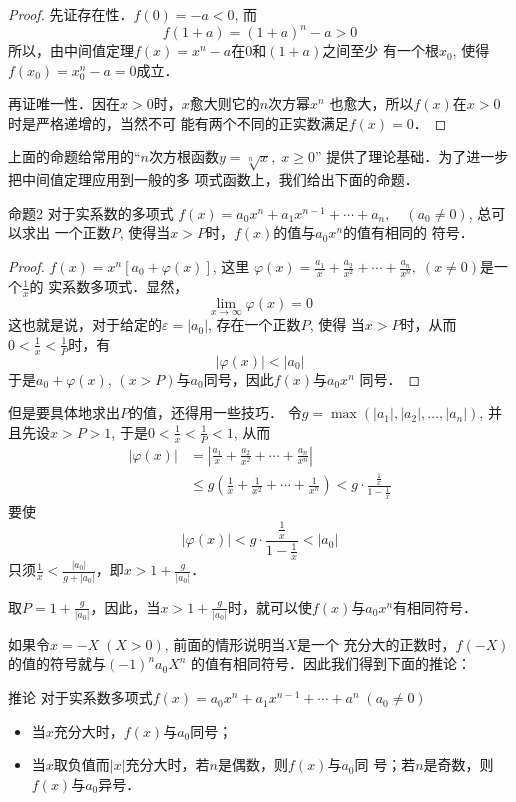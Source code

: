 \begin{proof}
    先证存在性．$f(0)=-a<0$, 而
\[f(1+a)=(1+a)^n-a>0\]
所以，由中间值定理$f(x)=x^n-a$在0和$(1+a)$之间至少
有一个根$x_0$, 使得$f(x_0)=x_0^n-a=0$成立．

再证唯一性．因在$x>0$时，$x$愈大则它的$n$次方幂$x^n$
也愈大，所以$f(x)$在$x>0$时是严格递增的，当然不可
能有两个不同的正实数满足$f(x)=0$．
\end{proof}

上面的命题给常用的“$n$次方根函数$y=\sqrt[n]{x},\; x\ge0$”
提供了理论基础．为了进一步把中间值定理应用到一般的多
项式函数上，我们给出下面的命题．

\begin{blk}{命题2 }
对于实系数的多项式
$f(x)=a_0x^n+a_1x^{n-1}+\cdots+a_n,\quad (a_0\ne 0)$, 总可以求出
一个正数$P$, 使得当$x>P$时，$f(x)$的值与$a_0x^n$的值有相同的
符号．
\end{blk}

\begin{proof}
$f(x)=x^n[a_0+\varphi(x)]$, 这里
$\varphi(x)=\frac{a_1}{x}+\frac{a_2}{x^2}+\cdots+\frac{a_n}{x^n},\; (x\ne 0)$是一个$\frac{1}{x}$的
实系数多项式．显然，
\[\lim_{x\to\infty} \varphi(x)=0\]
这也就是说，对于给定的$\varepsilon=|a_0|$, 存在一个正数$P$, 使得
当$x>P$时，从而$0<\frac{1}{x}<\frac{1}{P}$时，有
\[|\varphi(x)|<|a_0|\]
于是$a_0+\varphi(x)$, $(x>P)$与$a_0$同号，因此$f(x)$与$a_0x^n$
同号．
\end{proof}

但是要具体地求出$P$的值，还得用一些技巧．
令$g=\max(|a_1|,|a_2|,\ldots,|a_n|)$, 并且先设$x>P>
1$, 于是$0<\frac{1}{x}<\frac{1}{P}<1$, 从而
\[\begin{split}
    |\varphi(x)|&=\left|\frac{a_1}{x}+\frac{a_2}{x^2}+\cdots+\frac{a_n}{x^n}\right|\\
    &\le g\left(\frac{1}{x}+\frac{1}{x^2}+\cdots+\frac{1}{x^n}\right)< g\cdot \frac{\frac{1}{x}}{1-\frac{1}{x}}
\end{split}\]
要使
\[|\varphi(x)|<g\cdot \frac{\frac{1}{x}}{1-\frac{1}{x}}<|a_0|\]
只须$\frac{1}{x}<\frac{|a_0|}{g+|a_0|}$，即$x>1+\frac{g}{|a_0|}$．

取$P=1+\frac{g}{|a_0|}$，因此，当$x>1+\frac{g}{|a_0|}$时，就可以使$f(x)$与$a_0x^n$有相同符号．

如果令$x=-X\; (X>0)$, 前面的情形说明当$X$是一个
充分大的正数时，$f(-X)$的值的符号就与$(-1)^na_0X^n$
的值有相同符号．因此我们得到下面的推论：

\begin{blk}{推论}
    对于实系数多项式$f(x)=a_0x^n+a_1x^{n-1}+\cdots+a^n\; (a_0\ne 0)$
\begin{itemize}
    \item 当$x$充分大时，$f(x)$与$a_0$同号；
    \item 当$x$取负值而$|x|$充分大时，若$n$是偶数，则$f(x)$与$a_0$同
号；若$n$是奇数，则$f(x)$与$a_0$异号．
\end{itemize}
\end{blk}

